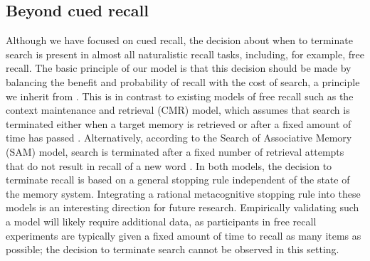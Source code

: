 \subsection{Beyond cued recall}

Although we have focused on cued recall, the decision about when to terminate search is present in almost all naturalistic recall tasks, including, for example, free recall. The basic principle of our model is that this decision should be made by balancing the benefit and probability of recall with the cost of search, a principle we inherit from \citet{anderson1989human}. This is in contrast to existing models of free recall such as the context maintenance and retrieval (CMR) model, which assumes that search is terminated either when a target memory is retrieved or after a fixed amount of time has passed \citep{polyn2009context,lohnas2015expanding}. Alternatively, according to the Search of Associative Memory (SAM) model, search is terminated after a fixed number of retrieval attempts that do not result in recall of a new word \citep{raaijmakers1981search}. In both models, the decision to terminate recall is based on a general stopping rule independent of the state of the memory system. Integrating a rational metacognitive stopping rule into these models is an interesting direction for future research. Empirically validating such a model will likely require additional data, as participants in free recall experiments are typically given a fixed amount of time to recall as many items as possible; the decision to terminate search cannot be observed in this setting.


